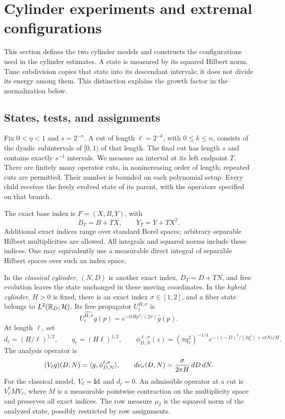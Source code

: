 \section{Cylinder experiments and extremal configurations}
\label{sec:cylinder}

This section defines the two cylinder models and constructs the configurations
used in the cylinder estimates.  A state is measured by its squared Hilbert
norm.  Time subdivision copies that state into its descendant intervals;
it does not divide its energy among them.  This distinction explains the
growth factor in the normalization below.

\subsection{States, tests, and assignments}

Fix $0<\eta<1$ and $s=2^{-n}$.  A cut of length $\ell=2^{-k}$, with
$0\le k\le n$, consists of the dyadic subintervals of $[0,1)$ of that
length.  The final cut has length $s$ and contains exactly $s^{-1}$
intervals.  We measure an interval
at its left endpoint $T$.  There are finitely many operator cuts, in
nonincreasing order of length; repeated cuts are permitted.  Their number
is bounded on each polynomial setup.  Every child receives the freely
evolved state of its parent, with the operators specified on that branch.

The exact base index is $F=(X,B,Y)$, with
\begin{equation}\label{cyl:base-flow}
 B_T=B+TX,\qquad Y_T=Y+TX^2.
\end{equation}
Additional exact indices range over standard Borel spaces; arbitrary
separable Hilbert multiplicities are allowed. All integrals and squared
norms include these indices. One may equivalently use a measurable
direct integral of separable Hilbert spaces over such an index space.

\begin{definition}\label{cyl:def-states}
In the \emph{classical cylinder}, $(N,D)$ is another exact index,
$D_T=D+TN$, and free evolution leaves the state unchanged in these moving
coordinates.  In the \emph{hybrid cylinder}, $H>0$ is fixed, there is an
exact index $\sigma\in[1,2]$, and a fiber state belongs to
$L^2(\mathbb R_D;\mathcal H)$.  Its free propagator $U_t^{H,\sigma}$ is
\[
 \widehat{U_t^{H,\sigma}g}(p)
       =e^{-itHp^2/(2\sigma)}\widehat g(p).
\]
At length $\ell$, set
\[
 d_\ell=(H/\ell)^{1/2},\qquad q_\ell=(H\ell)^{1/2},
 \qquad
 \phi_{D,N}^{\ell,\sigma}(z)
  =(\pi q_\ell^2)^{-1/4}
    e^{-(z-D)^2/(2q_\ell^2)+i\sigma Nz/H}.
\]
The analysis operator is
\[
 (V_\ell g)(D,N)=\langle g,\phi_{D,N}^{\ell,\sigma}\rangle,
 \qquad d\nu_\sigma(D,N)=\frac{\sigma}{2\pi H}\,dD\,dN.
\]
For the classical model, $V_\ell=\mathrm{Id}$ and $d_\ell=0$.
An admissible operator at a cut is $V_\ell^*MV_\ell$, where $M$ is a
measurable pointwise contraction on the multiplicity space and preserves
all exact indices.  The row measure $\mu_I$ is the squared norm of the
analyzed state, possibly restricted by row assignments.
\end{definition}


